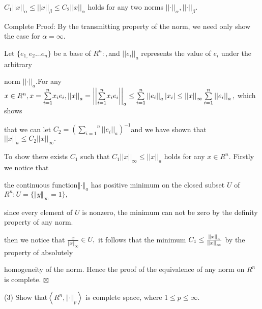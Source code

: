 \documentclass{article}
\begin{document}
$C_{1}\left\vert \left\vert x\right\vert \right\vert _{\alpha }\leq
||x||_{\beta }\leq C_{2}\left\vert \left\vert x\right\vert \right\vert
_{\alpha }$ holds for any two norms $\left\vert \left\vert \cdot \right\vert
\right\vert _{\alpha },\left\vert \left\vert \cdot \right\vert \right\vert
_{\beta }.$

Complete Proof: By the transmitting property of the norm, we need only show
the case for $\alpha =\infty .$

Let $\{e_{1,}e_{2}...e_{n}\}$ be a base of $R^{n}:,$and $\left\vert
\left\vert e_{i}\right\vert \right\vert _{a}$ represents the value of $e_{i}$
under the arbitrary

norm $\left\vert \left\vert \cdot \right\vert \right\vert _{a}.$For any $%
x\in R^{n},x=\overset{n}{\underset{i=1}{\sum }}x_{i}e_{i},\left\vert
\left\vert x\right\vert \right\vert _{a}=\left\vert \left\vert \overset{n}{%
\underset{i=1}{\sum }}x_{i}e_{i}\right\vert \right\vert _{a}\leq \overset{n}{%
\underset{i=1}{\sum }}\left\vert \left\vert e_{i}\right\vert \right\vert
_{a}\left\vert x_{i}\right\vert \leq \left\vert \left\vert x\right\vert
\right\vert _{\infty }\overset{n}{\underset{i=1}{\sum }}\left\vert
\left\vert e_{i}\right\vert \right\vert _{a},$ which shows

that we can let $C_{2}=\left( \overset{n}{\underset{i=1}{\sum }}\left\vert
\left\vert e_{i}\right\vert \right\vert _{a}\right) ^{-1}$and we have shown
that $||x||_{a}\leq C_{2}\left\vert \left\vert x\right\vert \right\vert
_{\infty }.$

To show there exists $C_{1}$ such that $C_{1}\left\vert \left\vert
x\right\vert \right\vert _{\infty }\leq ||x||_{a}$ holds for any $x\in
R^{n}. $ Firstly we notice that

the continuous function$\left\Vert \cdot \right\Vert _{a}$ has positive
minimum on the closed subset $U$ of $R^{n}:U=\{\left\Vert y\right\Vert
_{\infty }=1\},$

since every element of $U$ is nonzero, the minimum can not be zero by the
definity property of any norm.

then we notice that $\frac{x}{\left\Vert x\right\Vert _{\infty }}\in U,$ it
follows that the minimum $C_{1}\leq \frac{\left\Vert x\right\Vert _{a}}{%
\left\Vert x\right\Vert _{\infty }}$ by the property of absolutely \qquad
\qquad\ \ 

homogeneity of the norm. Hence the proof of the equivalence of any norm on $%
R^{n}$ is complete. $\boxtimes $

(3) Show that$\left\langle R^{n},\left\Vert \cdot \right\Vert
_{p}\right\rangle $ is complete space, where 1$\leq p\leq \infty $.
\end{document}
